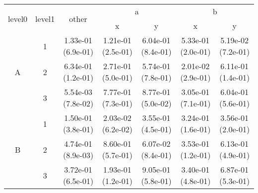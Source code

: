 \begin{tabular}{ccccccc}
\toprule
\multirow{2}{*}{level0} & \multirow{2}{*}{level1}& \multirow{2}{*}{other}&\multicolumn{2}{c}{a}&\multicolumn{2}{c}{b}\tabularnewline
\cmidrule(lr){4-5}
\cmidrule(lr){6-7}
&&&x&y&x&y\tabularnewline
\midrule
\multirow{3}{*}{A}&1& 1.33e-01 (6.9e-01)& 1.21e-01 (2.5e-01)& 6.04e-01 (8.4e-01)& 5.33e-01 (2.0e-01)& 5.19e-02 (7.2e-01)\tabularnewline
&2& 6.34e-01 (1.2e-01)& 2.71e-01 (5.0e-01)& 5.74e-01 (7.8e-01)& 2.01e-02 (2.9e-01)& 6.11e-01 (1.4e-01)\tabularnewline
&3& 5.54e-03 (7.8e-02)& 7.77e-01 (7.3e-01)& 8.77e-01 (5.0e-02)& 3.05e-01 (7.1e-01)& 6.04e-01 (5.6e-01)\tabularnewline
\midrule
\multirow{3}{*}{B}&1& 1.50e-01 (3.8e-01)& 2.03e-02 (6.2e-02)& 3.55e-01 (4.5e-01)& 3.24e-01 (1.6e-01)& 3.56e-01 (2.0e-01)\tabularnewline
&2& 4.74e-01 (8.9e-03)& 8.60e-01 (5.7e-01)& 6.07e-02 (8.4e-01)& 3.53e-01 (1.2e-01)& 6.13e-01 (4.9e-01)\tabularnewline
&3& 3.72e-01 (6.5e-01)& 1.93e-01 (1.2e-01)& 9.05e-01 (5.8e-01)& 3.40e-01 (4.8e-01)& 6.87e-01 (5.3e-01)\tabularnewline
\bottomrule
\end{tabular}
